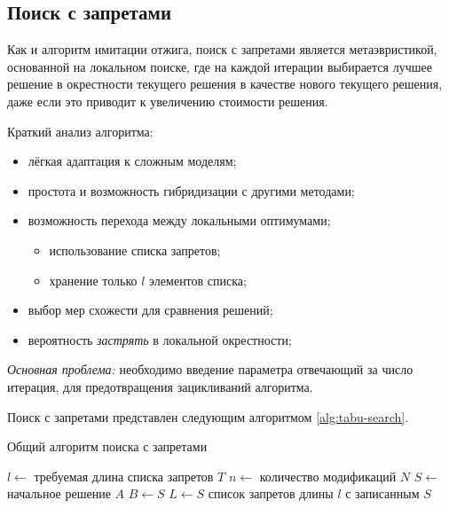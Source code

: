 \subsection{Поиск с запретами}
Как и алгоритм имитации отжига, поиск с запретами является метаэвристикой, основанной на локальном поиске, 
где на каждой итерации выбирается лучшее решение в окрестности текущего решения в качестве нового текущего 
решения, даже если это приводит к увеличению стоимости решения.

Краткий анализ алгоритма:
\begin{itemize}
    \item лёгкая адаптация к сложным моделям;
    \item простота и возможность гибридизации с другими методами;
    \item возможность перехода между локальными оптимумами;
    \begin{itemize}
        \item использование списка запретов;
        \item хранение только \( l \) элементов списка;
    \end{itemize}
    \item выбор мер схожести для сравнения решений;
    \item вероятность \emph{застрять} в локальной окрестности;
\end{itemize}

\emph{Основная проблема:} необходимо введение параметра отвечающий за число итерация, для предотвращения 
зацикливаний алгоритма.

Поиск с запретами представлен следующим алгоритмом \ref{alg:tabu-search}.

\clearpage

\begin{algorithm}[ht!]
    \caption{Общий алгоритм поиска с запретами}
    \( l \leftarrow \) требуемая длина списка запретов \( T \)\;
    \( n \leftarrow \) количество модификаций \( N \)\;
    \( S \leftarrow \) начальное решение \( A \)\;
    \( B \leftarrow S \)\;
    \( L \leftarrow { S } \) список запретов длины \( l \) с записанным \( S \)\;
    \label{alg:tabu-search}
\end{algorithm}

